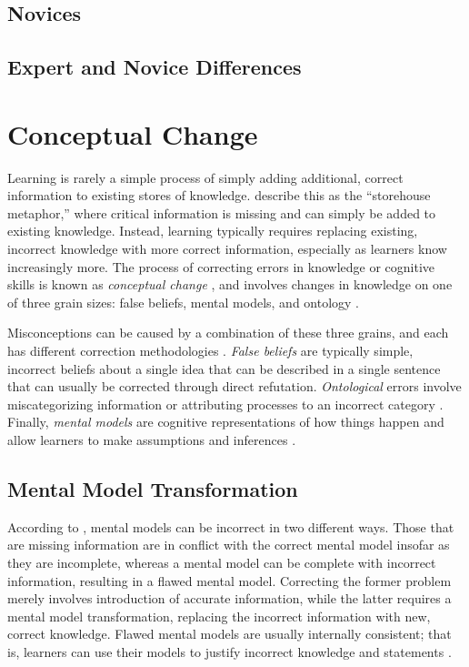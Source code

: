\subsection{Novices}


\subsection{Expert and Novice Differences}


\section{Conceptual Change}

Learning is rarely a simple process of simply adding additional, correct information to existing stores of knowledge. \citet{Klein2006} describe this as the ``storehouse metaphor,'' where critical information is missing and can simply be added to existing knowledge. Instead, learning typically requires replacing existing, incorrect knowledge with more correct information, especially as learners know increasingly more. The process of correcting errors in knowledge or cognitive skills is known as \emph{conceptual change} \citep{Chi2008}, and involves changes in knowledge on one of three grain sizes: false beliefs, mental models, and ontology \citep{Gadgil2012}.

Misconceptions can be caused by a combination of these three grains, and each has different correction methodologies \citep{Gadgil2012}. \emph{False beliefs} are typically simple, incorrect beliefs about a single idea that can be described in a single sentence that can usually be corrected through direct refutation. \emph{Ontological} errors involve miscategorizing information or attributing processes to an incorrect category \citep{Chi1994}. Finally, \emph{mental models} are cognitive representations of how things happen \citep{Klein2006} and allow learners to make assumptions and inferences \citep{Gadgil2012}.

\subsection{Mental Model Transformation}

According to \citet{Chi2008}, mental models can be incorrect in two different ways. Those that are missing information are in conflict with the correct mental model insofar as they are incomplete, whereas a mental model can be complete with incorrect information, resulting in a flawed mental model. Correcting the former problem merely involves introduction of accurate information, while the latter requires a mental model transformation, replacing the incorrect information with new, correct knowledge. Flawed mental models are usually internally consistent; that is, learners can use their models to justify incorrect knowledge and statements \citep{Vosniadou1994}.

